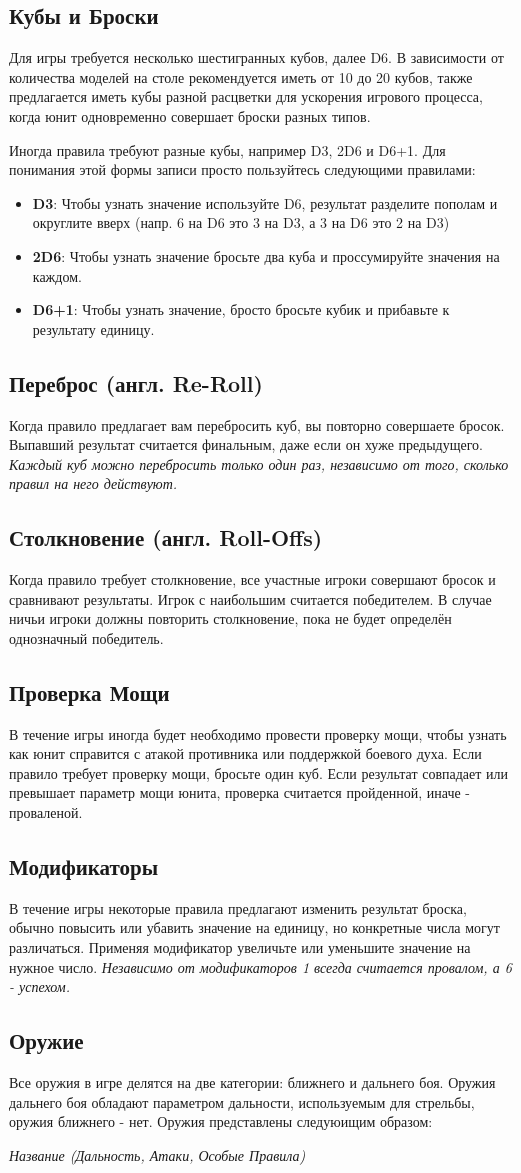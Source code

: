 \documentclass[twocolumn]{article}
\newcommand{\h}[1]{\textbf{#1}}
\newcommand{\D}[1][6]{D#1\xspace}
\newcommand{\subsec}[1]{\subsection{#1}\label{subsec:#1}}
\begin{document}
\subsec{Кубы и Броски}
Для игры требуется несколько шестигранных кубов, далее \D[6]. В зависимости от количества моделей на столе рекомендуется иметь от 10 до 20 кубов, также предлагается иметь кубы разной расцветки для ускорения игрового процесса, когда юнит одновременно совершает броски разных типов.

Иногда правила требуют разные кубы, например \D[3], 2\D и \D+1. Для понимания этой формы записи просто пользуйтесь следующими правилами:

\begin{itemize}
    \item \h{\D[3]}: Чтобы узнать значение используйте \D, результат разделите пополам и округлите вверх (напр. 6 на \D  это 3 на \D[3], а 3 на \D это 2 на \D[3])
    \item \h{2\D}: Чтобы узнать значение бросьте два куба и проссумируйте значения на каждом.
    \item \h{\D[6]+1}: Чтобы узнать значение, бросто бросьте кубик и прибавьте к результату единицу.
\end{itemize}

\subsec{Переброс (англ. Re-Roll)}
Когда правило предлагает вам перебросить куб, вы повторно совершаете бросок. Выпавший результат считается финальным, даже если он хуже предыдущего. \emph{Каждый куб можно перебросить только один раз, независимо от того, сколько правил на него действуют.}

\subsec{Столкновение (англ. Roll-Offs)}
Когда правило требует столкновение, все участные игроки совершают бросок и сравнивают результаты. Игрок с наибольшим считается победителем. В случае ничьи игроки должны повторить столкновение, пока не будет определён однозначный победитель.

\subsec{Проверка Мощи}
В течение игры иногда будет необходимо провести проверку мощи, чтобы узнать как юнит справится с атакой противника или поддержкой боевого духа. Если правило требует проверку мощи, бросьте один куб. Если результат совпадает или превышает параметр мощи юнита, проверка считается пройденной, иначе - проваленой.

\subsec{Модификаторы}
В течение игры некоторые правила предлагают изменить результат броска, обычно повысить или убавить значение на единицу, но конкретные числа могут различаться. Применяя модификатор увеличьте или уменьшите значение на нужное число. \emph{Независимо от модификаторов 1 всегда считается провалом, а 6 - успехом.}

\subsec{Оружие}
Все оружия в игре делятся на две категории: ближнего и дальнего боя. Оружия дальнего боя обладают параметром дальности, используемым для стрельбы, оружия ближнего - нет. Оружия представлены следуюищим образом:
\begin{center}
    \textit{Название (Дальность, Атаки, Особые Правила)}
\end{center}
\end{document}
